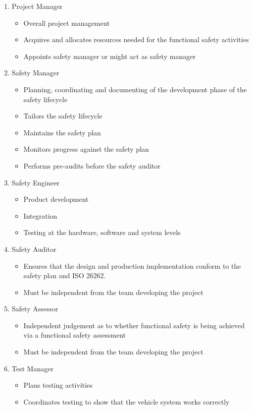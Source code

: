 \begin{enumerate}
  \item Project Manager
  \begin{itemize}
	\item Overall project management
	\item Acquires and allocates resources needed for the functional safety activities
	\item Appoints safety manager or might act as safety manager
  \end{itemize}
  \item Safety Manager
  \begin{itemize}
	\item Planning, coordinating and documenting of the development phase of the safety lifecycle
	\item Tailors the safety lifecycle
	\item Maintains the safety plan
	\item Monitors progress against the safety plan
	\item Performs pre-audits before the safety auditor
  \end{itemize}
  \item Safety Engineer
  \begin{itemize}
	\item Product development
	\item Integration
	\item Testing at the hardware, software and system levels
  \end{itemize}
  \item Safety Auditor
  \begin{itemize}
	\item Ensures that the design and production implementation conform to the safety plan and ISO 26262.
	\item Must be independent from the team developing the project
  \end{itemize}
  \item Safety Assessor
  \begin{itemize}
	\item Independent judgement as to whether functional safety is being achieved via a functional safety assessment
	\item Must be independent from the team developing the project
  \end{itemize}
  \item Test Manager
  \begin{itemize}
	\item Plans testing activities
	\item Coordinates testing to show that the vehicle system works correctly
  \end{itemize}
\end{enumerate}
